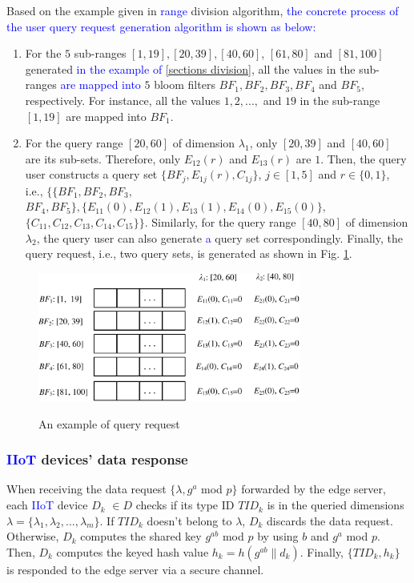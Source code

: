\documentclass[IEEE JOURNAL OF BIOMEDICAL AND HEALTH INFORMATICS]{IEEEtran}
\begin{document}
{ Based on the example given in \textcolor{blue}{range} division algorithm, \textcolor{blue}{the concrete process of the user query request generation algorithm is shown as below:} \label{example}
 	\begin{enumerate}
 		\item For the $5$ sub-ranges $[1, 19], [20, 39], [40, 60] $, $[61 , 80]$ and $[81, 100]$ generated \textcolor{blue}{in the example of \ref{sections division}}, all the values in the sub-ranges \textcolor{blue}{are mapped into} $5$ bloom filters $BF_1,BF_2,BF_3,BF_4$ and $BF_5$, respectively. For instance, all the values $1, 2, ..., $ and $ 19$ in the sub-range $[1, 19]$ are mapped into $BF_1$.
 		\item For the query range $[20, 60]$ of dimension $\lambda_1$, only $[20, 39]$ and $[40, 60]$ are its sub-sets. Therefore, only $E_{12}(r)$ and $E_{13}(r)$ are $1$. Then, the query user constructs a query set $\{BF_j, E_{1j}(r), C_{1j}\}$, $j\in [1, 5]$ and $r \in \{0,1\}$, i.e., $\{\{BF_1, BF_2,BF_3,$ $ BF_4, BF_5\}, \{E_{11}(0),E_{12}(1), E_{13}(1), E_{14}(0), E_{15}(0)\},$ $ \{C_{11}, C_{12}, C_{13}, C_{14}, C_{15}\}\}$. Similarly, for the query range $[40, 80]$ of dimension $\lambda_2$, the query user can also generate \textcolor{blue}{a} query set correspondingly. Finally, the query request, i.e., two query sets, is generated as shown in Fig. \ref{query_request_example}.
 	\end{enumerate}
 	
 \begin{figure}
 	\centering
 	\includegraphics[width=3.4in]{query_request_example}\\
 	\caption{An example of query request}\label{query_request_example}
 \end{figure}

\subsubsection{\textcolor{blue}{IIoT} devices' data response}
 When receiving the data request $\{\lambda,  g^a$ mod $p\}$ forwarded by the edge server, each \textcolor{blue}{IIoT} device $D_k$ $\in D$ checks if its type ID $TID_k$ is in the queried dimensions $\lambda=\{\lambda_1, \lambda_2, ..., \lambda_m\}$. If $TID_k$ doesn't belong to $\lambda$, $D_k$ discards the data request. Otherwise, $D_k$ computes the shared key $g^{ab}$ mod $p$ by using $b$ and $g^a$ mod $p$. Then, $D_k$ computes the
  keyed hash value $h_k=h(g^{ab} \| d_k)$. Finally, $\{TID_k, h_k\}$ is responded to the edge server via a secure channel.

}
\end{document}
